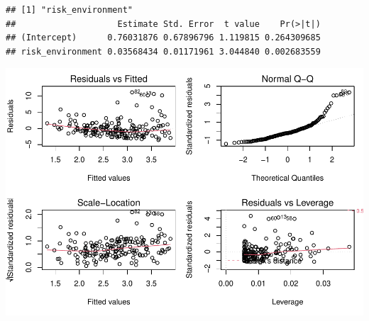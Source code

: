 \documentclass[
]{article}
\begin{document}
\begin{verbatim}
## [1] "risk_environment"
##                    Estimate Std. Error  t value    Pr(>|t|)
## (Intercept)      0.76031876 0.67896796 1.119815 0.264309685
## risk_environment 0.03568434 0.01171961 3.044840 0.002683559
\end{verbatim}

\includegraphics{Basic-Regression_files/figure-latex/unnamed-chunk-6-6.pdf}
\end{document}
